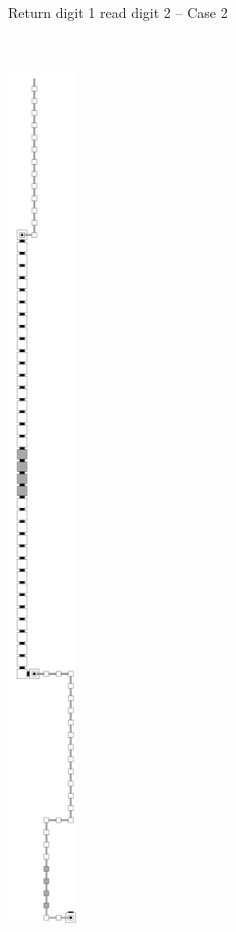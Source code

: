 \begin{figure}[H]
\begin{subfigure}[t]{0.2\textwidth}
        \caption{\label{fig:return_digit1_read_digit2_case2_msr} Return digit 1 read digit 2 -- Case 2}
    \end{subfigure}%
    ~
    \begin{subfigure}[t]{0.2\textwidth}
        \centering
        \includegraphics[width=0.2\textwidth]{return_paths/return_digit2_read_digit3_general}

\end{subfigure}
\end{figure}
